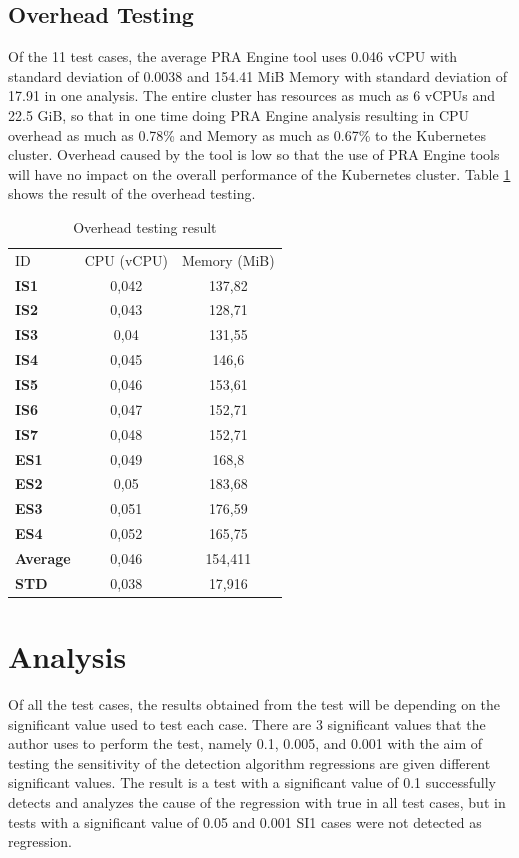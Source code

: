 \documentclass[conference]{configs/IEEEtran}
\begin{document}
\subsection{Overhead Testing}
Of the 11 test cases, the average PRA Engine tool uses 0.046
vCPU with standard deviation of 0.0038 and 154.41 MiB Memory with standard
deviation of 17.91 in one analysis. The entire cluster has resources
as much as 6 vCPUs and 22.5 GiB, so that in one time doing PRA Engine analysis
resulting in CPU overhead as much as 0.78\% and Memory as much as 0.67\% to the Kubernetes cluster. Overhead caused by the tool is low so that the use of PRA Engine tools will have no impact on the overall performance of the Kubernetes cluster. Table \ref{overhead-tbl} shows the result of the overhead testing.
\begin{table}[!htb]
	\caption{Overhead testing result}
	\label{overhead-tbl}
	\centering
	\begin{tabular}{|l|c|c|}
		\hline
		ID & CPU (vCPU) & Memory (MiB) \\
		\textbf{IS1}     & 0,042 & 137,82  \\ \hline
		\textbf{IS2}     & 0,043 & 128,71  \\ \hline
		\textbf{IS3}     & 0,04  & 131,55  \\ \hline
		\textbf{IS4}     & 0,045 & 146,6   \\ \hline
		\textbf{IS5}     & 0,046 & 153,61  \\ \hline
		\textbf{IS6}     & 0,047 & 152,71  \\ \hline
		\textbf{IS7}     & 0,048 & 152,71  \\ \hline
		\textbf{ES1}     & 0,049 & 168,8   \\ \hline
		\textbf{ES2}     & 0,05  & 183,68  \\ \hline
		\textbf{ES3}     & 0,051 & 176,59  \\ \hline
		\textbf{ES4}     & 0,052 & 165,75  \\ \hline
		\textbf{Average} & 0,046 & 154,411 \\ \hline
		\textbf{STD}     & 0,038 & 17,916  \\ \hline
	\end{tabular}
\end{table}
\pagebreak

\section{Analysis}
Of all the test cases, the results obtained from the test will be
depending on the significant value used to test each case.
There are 3 significant values that the author uses to perform the test, namely 0.1, 0.005, and 0.001 with the aim of testing the sensitivity of the detection algorithm regressions are given different significant values. The result is a test with
a significant value of 0.1 successfully detects and analyzes the cause of the regression with true in all test cases, but in tests with a significant value of 0.05 and 0.001 SI1 cases were not detected as regression.
\end{document}
